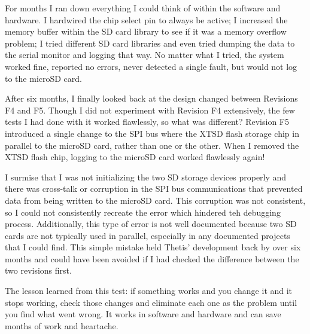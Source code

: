 For months I ran down everything I could think of within the software and hardware.
I hardwired the chip select pin to always be active;
I increased the memory buffer within the SD card library to see if it was a memory overflow problem;
I tried different SD card libraries and even tried dumping the data to the serial monitor and logging that way.
No matter what I tried, the system worked fine, reported no errors, never detected a single fault, but would not log to the microSD card.

After six months, I finally looked back at the design changed between Revisions F4 and F5.
Though I did not experiment with Revision F4 extensively, the few tests I had done with it worked flawlessly, so what was different?
Revision F5 introduced a single change to the SPI bus where the XTSD flash storage chip in parallel to the microSD card, rather than one or the other.
When I removed the XTSD flash chip, logging to the microSD card worked flawlessly again!

I surmise that I was not initializing the two SD storage devices properly and there was cross-talk or corruption in the SPI bus communications that prevented data from being written to the microSD card.
This corruption was not consistent, so I could not consistently recreate the error which hindered teh debugging process.
Additionally, this type of error is not well documented because two SD cards are not typically used in parallel, especially in any documented projects that I could find.
This simple mistake held Thetis' development back by over six months and could have been avoided if I had checked the difference between the two revisions first.

The lesson learned from this test: if something works and you change it and it stops working, check those changes and eliminate each one as the problem until you find what went wrong.
It works in software and hardware and can save months of work and heartache.